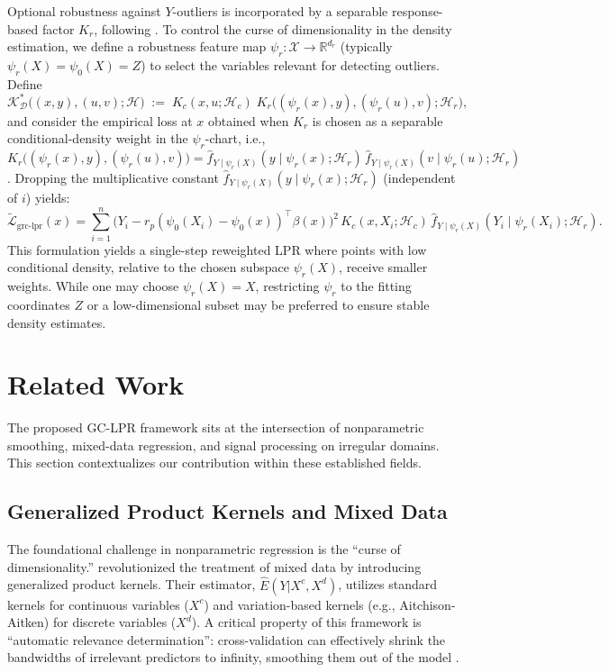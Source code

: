 \documentclass[final,1p,times,authoryear]{elsarticle}
\newcommand{\R}{\mathbb{R}}
\newcommand{\D}{\mathcal{D}}
\newcommand{\K}{\mathcal{K}}
\newcommand{\Lcal}{\mathcal{L}}
\newcommand{\Hcal}{\mathcal{H}}
\begin{document}
Optional robustness against $Y$-outliers is incorporated by a separable response-based factor $K_r$, following \citet{shulman2025robust}. To control the curse of dimensionality in the density estimation, we define a robustness feature map $\psi_r: \mathcal{X} \to \R^{d_r}$ (typically $\psi_r(X)=\psi_0(X)=Z$) to select the variables relevant for detecting outliers. Define
\begin{equation}
\label{eq:grc_decomp}
\K_{\D}^*\big((x,y),(u,v);\Hcal\big)\;:=\;K_c(x,u;\Hcal_c)\;K_r\big((\psi_r(x),y),(\psi_r(u),v);\Hcal_r\big),
\end{equation}
and consider the empirical loss at $x$ obtained when $K_r$ is chosen as a separable conditional-density weight in the $\psi_r$-chart, i.e.,
$K_r\big((\psi_r(x),y),(\psi_r(u),v)\big)=\hat f_{Y\mid \psi_r(X)}(y\mid \psi_r(x);\Hcal_r)\,\hat f_{Y\mid \psi_r(X)}(v\mid \psi_r(u);\Hcal_r)$.
Dropping the multiplicative constant $\hat f_{Y\mid \psi_r(X)}(y\mid \psi_r(x);\Hcal_r)$ (independent of $i$) yields:
\begin{equation}
\label{eq:grc_simple_loss}
\tilde{\Lcal}_{\text{grc-lpr}}(x)
=\sum_{i=1}^{n}\Big(Y_i-r_p(\psi_0(X_i)-\psi_0(x))^\top\beta(x)\Big)^2\,K_c(x,X_i;\Hcal_c)\,\hat f_{Y\mid \psi_r(X)}(Y_i \mid \psi_r(X_i);\Hcal_r).
\end{equation}
This formulation yields a single-step reweighted LPR where points with low conditional density, relative to the chosen subspace $\psi_r(X)$, receive smaller weights. While one may choose $\psi_r(X)=X$, restricting $\psi_r$ to the fitting coordinates $Z$ or a low-dimensional subset may be preferred to ensure stable density estimates.

\section{Related Work}
\label{s:Related Work}

The proposed GC-LPR framework sits at the intersection of nonparametric smoothing, mixed-data regression, and signal processing on irregular domains. This section contextualizes our contribution within these established fields.

\subsection{Generalized Product Kernels and Mixed Data}
The foundational challenge in nonparametric regression is the ``curse of dimensionality.'' \citet{li2004nonparametric} revolutionized the treatment of mixed data by introducing generalized product kernels. Their estimator, $\hat{E}(Y|X^c, X^d)$, utilizes standard kernels for continuous variables ($X^c$) and variation-based kernels (e.g., Aitchison-Aitken) for discrete variables ($X^d$). A critical property of this framework is ``automatic relevance determination'': cross-validation can effectively shrink the bandwidths of irrelevant predictors to infinity, smoothing them out of the model \citep{hall2007nonparametric}.
\end{document}
